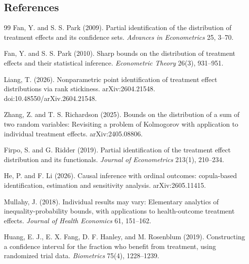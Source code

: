 \documentclass[11pt]{article}
\theoremstyle{definition}
\theoremstyle{plain}
\theoremstyle{remark}
\begin{document}
\subsection*{References}
\begin{thebibliography}{99}
Fan, Y. and S. S. Park (2009).
\newblock Partial identification of the distribution of treatment effects and its confidence sets.
\newblock \emph{Advances in Econometrics} 25, 3--70.

Fan, Y. and S. S. Park (2010).
\newblock Sharp bounds on the distribution of treatment effects and their statistical inference.
\newblock \emph{Econometric Theory} 26(3), 931--951.

Liang, T. (2026).
\newblock Nonparametric point identification of treatment effect distributions via rank stickiness.
\newblock arXiv:2604.21548.
\newblock doi:10.48550/arXiv.2604.21548.

Zhang, Z. and T. S. Richardson (2025).
\newblock Bounds on the distribution of a sum of two random variables: Revisiting a problem of Kolmogorov with application to individual treatment effects.
\newblock arXiv:2405.08806.

Firpo, S. and G. Ridder (2019).
\newblock Partial identification of the treatment effect distribution and its functionals.
\newblock \emph{Journal of Econometrics} 213(1), 210--234.

He, P. and F. Li (2026).
\newblock Causal inference with ordinal outcomes: copula-based identification, estimation and sensitivity analysis.
\newblock arXiv:2605.11415.

Mullahy, J. (2018).
\newblock Individual results may vary: Elementary analytics of inequality-probability bounds, with applications to health-outcome treatment effects.
\newblock \emph{Journal of Health Economics} 61, 151--162.

Huang, E. J., E. X. Fang, D. F. Hanley, and M. Rosenblum (2019).
\newblock Constructing a confidence interval for the fraction who benefit from treatment, using randomized trial data.
\newblock \emph{Biometrics} 75(4), 1228--1239.


\end{thebibliography}
\end{document}
